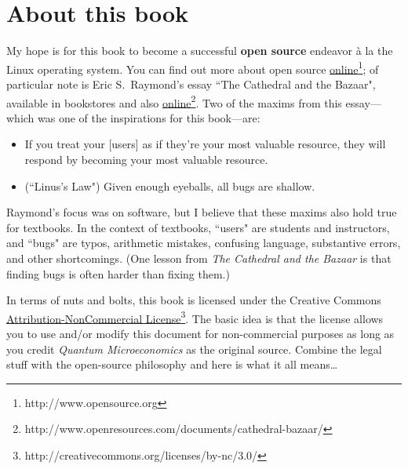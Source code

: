 
\section*{About this book}

My hope is for this book to become a successful \textbf{open source} endeavor \`{a} la the Linux operating system. You can find out more about open source \href{http://www.opensource.org}{online}\footnote{http://www.opensource.org}; of particular note is Eric S.~Raymond's essay ``The Cathedral and the Bazaar", available in bookstores and also \href{http://www.openresources.com/documents/cathedral-bazaar/}{online}\footnote{http://www.openresources.com/documents/cathedral-bazaar/}. %
Two of the maxims from this essay---which was one of the inspirations for this book---are:
\begin{itemize}
\item If you treat your [users] as if they're your most valuable resource, they will respond by becoming your most valuable resource.
\item (``Linus's Law") Given enough eyeballs, all bugs are shallow.
\end{itemize}
%
Raymond's focus was on software, but I believe that these maxims also hold true for textbooks. In the context of textbooks, ``users" are students and instructors, and ``bugs" are typos, arithmetic mistakes, confusing language, substantive errors, and other shortcomings. (One lesson from \emph{The Cathedral and the Bazaar} is that finding bugs is often harder than fixing them.)

In terms of nuts and bolts, this book is licensed under the Creative Commons  \href{http://creativecommons.org/licenses/by-nc/3.0/}{Attribution-NonCommercial License}\footnote{http://creativecommons.org/licenses/by-nc/3.0/}. The basic idea is that the license allows you to use and/or modify this document for non-commercial purposes as long as you credit \emph{Quantum Microeconomics} as the original source. Combine the legal stuff with the open-source philosophy and here is what it all means\ldots

